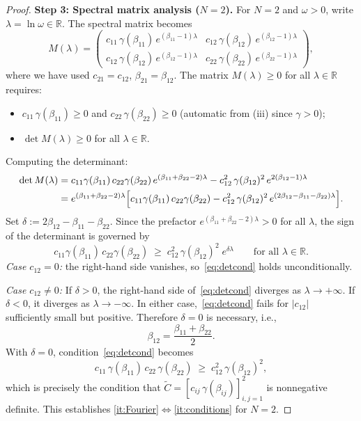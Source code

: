 \documentclass[12pt]{article}
\theoremstyle{definition}
\theoremstyle{remark}
\newcommand{\R}{\mathbb{R}}
\newcommand{\bC}{\widetilde{C}}
\begin{document}
\begin{proof}
\medskip
\noindent\textbf{Step 3: Spectral matrix analysis ($N=2$).}
For $N=2$ and $\omega>0$, write $\lambda = \ln\omega\in\R$.  The spectral matrix becomes
\[
  M(\lambda) =
  \begin{pmatrix}
    c_{11}\,\gamma(\beta_{11})\,e^{(\beta_{11}-1)\lambda} &
    c_{12}\,\gamma(\beta_{12})\,e^{(\beta_{12}-1)\lambda} \\[3pt]
    c_{12}\,\gamma(\beta_{12})\,e^{(\beta_{12}-1)\lambda} &
    c_{22}\,\gamma(\beta_{22})\,e^{(\beta_{22}-1)\lambda}
  \end{pmatrix},
\]
where we have used $c_{21}=c_{12}$, $\beta_{21}=\beta_{12}$.
The matrix $M(\lambda)\ge 0$ for all $\lambda\in\R$ requires:
\begin{itemize}[nosep]
  \item $c_{11}\,\gamma(\beta_{11})\ge 0$ and $c_{22}\,\gamma(\beta_{22})\ge 0$
    (automatic from (iii) since $\gamma>0$);
  \item $\det M(\lambda)\ge 0$ for all $\lambda\in\R$.
\end{itemize}
Computing the determinant:
\begin{align}
  \det M(\lambda)
  &= c_{11}\gamma(\beta_{11})\,c_{22}\gamma(\beta_{22})\,
     e^{(\beta_{11}+\beta_{22}-2)\lambda}
     - c_{12}^2\,\gamma(\beta_{12})^2\,e^{2(\beta_{12}-1)\lambda}\notag\\
  &= e^{(\beta_{11}+\beta_{22}-2)\lambda}
    \Bigl[c_{11}\gamma(\beta_{11})\,c_{22}\gamma(\beta_{22})
     - c_{12}^2\,\gamma(\beta_{12})^2\,
       e^{(2\beta_{12}-\beta_{11}-\beta_{22})\lambda}\Bigr].
  \label{eq:det2x2}
\end{align}
Set $\delta := 2\beta_{12}-\beta_{11}-\beta_{22}$.  Since the prefactor
$e^{(\beta_{11}+\beta_{22}-2)\lambda}>0$ for all $\lambda$, the sign of the determinant
is governed by
\begin{equation}\label{eq:detcond}
  c_{11}\gamma(\beta_{11})\,c_{22}\gamma(\beta_{22})
  \;\ge\; c_{12}^2\,\gamma(\beta_{12})^2\;e^{\delta\lambda}
  \qquad\text{for all }\lambda\in\R.
\end{equation}
\emph{Case $c_{12}=0$:}  the right-hand side vanishes, so~\eqref{eq:detcond} holds
unconditionally.

\emph{Case $c_{12}\neq 0$:}
If $\delta>0$, the right-hand side of~\eqref{eq:detcond} diverges as $\lambda\to+\infty$.
If $\delta<0$, it diverges as $\lambda\to-\infty$.
In either case,~\eqref{eq:detcond} fails for $|c_{12}|$ sufficiently small but positive.
Therefore $\delta = 0$ is necessary, i.e.,
\begin{equation}\label{eq:meanexp}
  \beta_{12} = \frac{\beta_{11}+\beta_{22}}{2}.
\end{equation}
With $\delta=0$, condition~\eqref{eq:detcond} becomes
\begin{equation}\label{eq:CS}
  c_{11}\,\gamma(\beta_{11})\,c_{22}\,\gamma(\beta_{22})
  \;\ge\; c_{12}^2\,\gamma(\beta_{12})^2,
\end{equation}
which is precisely the condition that $\bC = [c_{ij}\,\gamma(\beta_{ij})]_{i,j=1}^2$ is
nonnegative definite.  This establishes \ref{it:Fourier}$\Leftrightarrow$\ref{it:conditions}
for $N=2$.


\end{proof}
\end{document}
